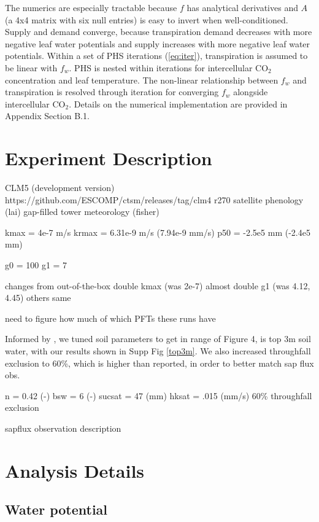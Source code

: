 \documentclass[draft,linenumbers]{agujournal}
\begin{document}
    The numerics are especially tractable because $f$ has analytical derivatives and $A$ 
    (a 4x4 matrix with six null entries) is easy to invert when well-conditioned. 
    Supply and demand converge, because transpiration demand decreases with more negative 
    leaf water potentials and supply increases with more negative leaf water potentials.
    Within a set of PHS iterations (\ref{eq:iter}), transpiration is assumed to be linear with $f_w$.
    PHS is nested within iterations for intercellular CO$_2$ concentration and leaf temperature.
    The non-linear relationship between $f_w$ and transpiration is resolved through iteration for converging $f_w$ alongside intercellular CO$_2$.
    Details on the numerical implementation are provided in Appendix Section B.1.

\section{Experiment Description}
CLM5 (development version) 
https://github.com/ESCOMP/ctsm/releases/tag/clm4
\textunderscore r270
satellite phenology (lai)
gap-filled tower meteorology (fisher)

kmax =  4e-7 m/s
krmax = 6.31e-9 m/s (7.94e-9 mm/s)
p50 = -2.5e5 mm (-2.4e5 mm)

g0 = 100
g1 = 7

changes from out-of-the-box
double kmax (was 2e-7)
almost double g1 (was 4.12, 4.45)
others same

need to figure how much of which PFTs these runs have

Informed by \cite{fisher2008}, we tuned soil parameters to get in range of 
\cite{fisher2007} Figure 4, is top 3m soil water, with our results shown in Supp Fig \ref{top3m}.
We also increased throughfall exclusion to 60\%, which is higher than reported, in order to better match sap flux obs.

n = 0.42 (-)
bsw = 6 (-)
sucsat = 47 (mm)
hksat = .015 (mm/s)
60\% throughfall exclusion

sapflux observation description


\section{Analysis Details}  
\subsection{Water potential}
\end{document}
